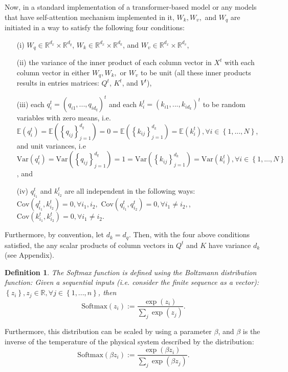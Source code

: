 \documentclass{article}
\theoremstyle{plain}
\theoremstyle{plain} %
\newtheorem{definition}[theorem]{Definition}
\theoremstyle{definition}  %
\theoremstyle{remark}  %
\theoremstyle{plain}
\begin{document}
Now, in a standard implementation of a transformer-based model or any models that have self-attention mechanism implemented in it, $W_k, W_v,$ and $W_q$ are initiated in a way to satisfy the following four conditions:
\begin{itemize}
\item[(i)] $W_q\in\mathbb{R}^{d_x}\times\mathbb{R}^{d_q}$, $W_k\in\mathbb{R}^{d_x}\times\mathbb{R}^{d_k}$, and $W_v\in\mathbb{R}^{d_x} \times \mathbb{R}^{d_v}$,
\item[(ii)] the variance of the inner product of each column vector in $X^t$ with each column vector in either $W_q, W_k,$ or $W_v$ to be unit (all these inner products results in entries matrices: $Q^t$, $K^t$, and $V^t$),
\item[(iii)] each $q_i^t=(q_{i1},...,q_{id_q})^t$ and each $k_i^t=(k_{i1},...,k_{id_k})^t$ to be random variables with zero means, i.e. $\mathbb{E}\left( q_i^t \right) = \mathbb{E}\left(\left\lbrace q_{ij} \right\rbrace_{j=1}^{d_q}\right) =0=\mathbb{E} \left(\left\lbrace k_{ij} \right\rbrace_{j=1}^{d_k}\right)=\mathbb{E}\left( k_i^t \right), \forall i\in\left\lbrace 1,...,N\right\rbrace$, and unit variances, i.e $\text{Var}\left(q^t_i\right) =\text{Var}\left(\left\lbrace q_{ij} \right\rbrace_{j=1}^{d_q}\right) =1=\text{Var} \left(\left\lbrace k_{ij} \right\rbrace_{j=1}^{d_k}\right)=\text{Var}\left(k^t_i\right), \forall i\in\left\lbrace 1,...,N\right\rbrace$, and
\item[(iv)] $q_{i_1}^t$ and $k_{i_2}^t$ are all independent in the following ways: $\text{Cov}\left( q^t_{i_1},k^t_{i_2}\right)=0, \forall i_1,i_2,$ $\text{Cov}\left( q^t_{i_1},q^t_{i_2}\right)=0, \forall i_1\neq i_2,$, $\text{Cov}\left( k^t_{i_1},k^t_{i_2}\right)=0, \forall i_1\neq i_2.$ 
\end{itemize}
Furthermore, by convention, let $d_k=d_q$. Then, with the four above conditions satisfied, the any scalar products of column vectors in $Q^t$ and $K$ have variance $d_k$ (see Appendix).

\begin{definition}
The Softmax function is defined using the Boltzmann distribution function: Given a sequential inputs (i.e. consider the finite sequence as a vector): $\left\lbrace z_i\right\rbrace, z_j\in\mathbb{R},\forall j\in\left\lbrace 1,...,n\right\rbrace$, then 
$$
\text{Softmax}(z_i) := \frac{\exp\left(z_i \right) }{\sum\limits_j \exp\left(z_j \right)}.
$$
\end{definition}

Furthermore, this distribution can be scaled by using a parameter $\beta$, and $\beta$ is the inverse of the temperature of the physical system described by the distribution:
$$
\text{Softmax}(\beta z_i) := \frac{\exp\left(\beta z_i \right) }{\sum\limits_j \exp\left(\beta z_j \right)}.
$$
\end{document}
